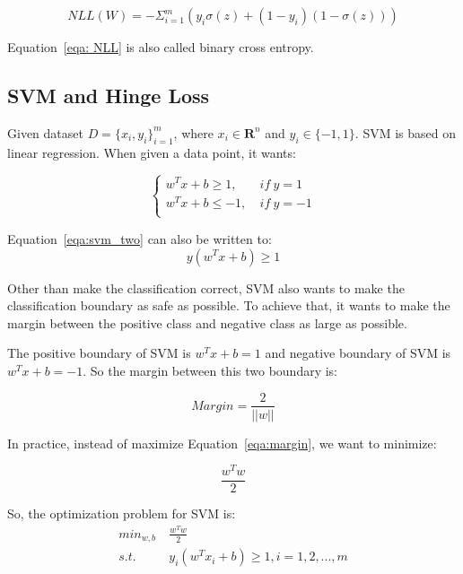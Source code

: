 \documentclass[journal, a4paper]{IEEEtran}
\begin{document}
\begin{equation}
\label{eqa: NLL}
NLL(W) = -\Sigma_{i=1}^{m} (y_i \sigma(z) + (1 - y_i)(1 - \sigma(z)))
\end{equation} \par
Equation~\ref{eqa: NLL} is also called binary cross entropy.

\subsection{SVM and Hinge Loss}
Given dataset $ D=\{x_{i}, y_{i}\}_{i=1}^{m}$, where $x_{i} \in \mathbf{R}^{n}$ and $y_{i} \in \{-1, 1\}$. SVM is based on linear regression. When given a data point, it wants: \par

\begin{equation}
\label{eqa:svm_two}
\left\{
\begin{array}{lr}
w^{T}x + b \geq 1,~&if~y = 1  \\
w^{T}x + b \leq -1,~&if~y = -1 \\
\end{array}
\right.
\end{equation} \par
Equation~\ref{eqa:svm_two} can also be written to:
\begin{equation}
	y(w^{T}x + b) \geq 1
\end{equation} \par
Other than make the classification correct, SVM also wants to make the classification boundary as safe as possible. To achieve that, it wants to make the margin between the positive class and negative class as large as possible. \par
The positive boundary of SVM is $w^Tx + b = 1$ and negative boundary of SVM is $w^Tx + b = -1$. So the margin between this two boundary is: \par
\begin{equation}
	\label{eqa:margin}
	Margin = \frac{2}{||w||}
\end{equation} \par
In practice, instead of maximize Equation~\ref{eqa:margin}, we want to minimize: \par
\begin{equation}
	\frac{w^Tw}{2}
\end{equation} \par
So, the optimization problem for SVM is:
\begin{equation}
	\begin{aligned}
	\label{eqa:svm_optimization}
	min_{w, b}~&\frac{w^Tw}{2} \\
	s.t.~&y_i(w^Tx_i + b) \geq 1, i=1, 2, ..., m
	\end{aligned}	
\end{equation} \par
\end{document}
